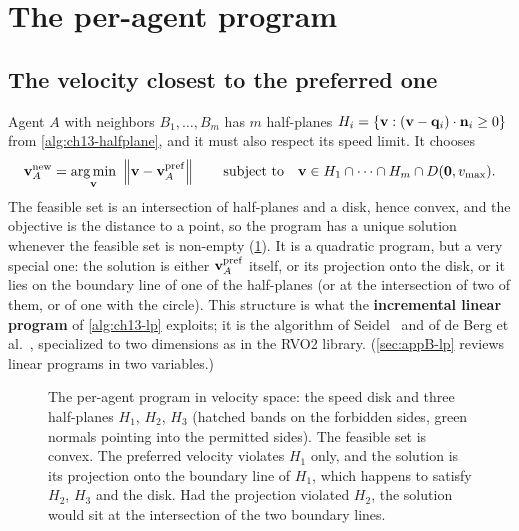 \section{The per-agent program}
\label{sec:ch13-lp}

\subsection{The velocity closest to the preferred one}

Agent $A$ with neighbors $B_1, \dots, B_m$ has $m$ half-planes
$H_i = \left\{ \mathbf{v} : (\mathbf{v} - \mathbf{q}_i)\cdot\mathbf{n}_i \ge 0 \right\}$ from
\cref{alg:ch13-halfplane}, and it must also respect its speed limit. It
chooses
\begin{equation}
  \vel_A^{\mathrm{new}} = \argmin_{\vel}\ \norm{\vel - \vel_A^{\mathrm{pref}}}
  \qquad \st \vel \in H_1 \cap \dots \cap H_m \cap \disc{\vect{0}}{v_{\max}}.
  \label{eq:ch13-program}
\end{equation}
The feasible set is an intersection of half-planes and a disk, hence
convex, and the objective is the distance to a point, so the program has a
unique solution whenever the feasible set is non-empty
(\cref{fig:ch13-lp}). It is a quadratic program, but a very special one: the
solution is either $\mathbf{v}_A^{\mathrm{pref}}$ itself, or its projection onto
the disk, or it lies on the boundary line of one of the half-planes (or at
the intersection of two of them, or of one with the circle). This structure
is what the \textbf{incremental linear program}
of \cref{alg:ch13-lp} exploits; it is the algorithm of
Seidel~\cite{seidel1991small} and of de Berg et al.~\cite{deberg2008computational},
specialized to two dimensions as in the RVO2 library.
(\cref{sec:appB-lp} reviews linear programs in two variables.)

\begin{figure}[tb]
  \centering
  \caption{The per-agent program in velocity space: the speed disk and three
  half-planes $H_1$, $H_2$, $H_3$ (hatched bands on the forbidden sides,
  green normals pointing into the permitted sides). The feasible set is
  convex. The preferred velocity violates $H_1$ only, and the solution is
  its projection onto the boundary line of $H_1$, which happens to satisfy
  $H_2$, $H_3$ and the disk. Had the projection violated $H_2$, the
  solution would sit at the intersection of the two boundary lines.}
  \label{fig:ch13-lp}
\end{figure}

